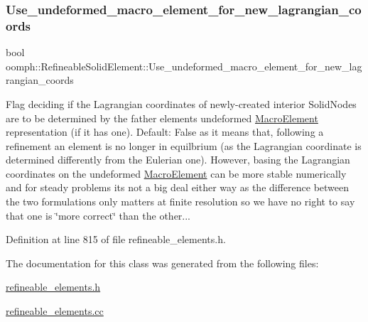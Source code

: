 \subsubsection{\texorpdfstring{Use\+\_\+undeformed\+\_\+macro\+\_\+element\+\_\+for\+\_\+new\+\_\+lagrangian\+\_\+coords}{Use\_undeformed\_macro\_element\_for\_new\_lagrangian\_coords}}
{\footnotesize\ttfamily bool oomph\+::\+Refineable\+Solid\+Element\+::\+Use\+\_\+undeformed\+\_\+macro\+\_\+element\+\_\+for\+\_\+new\+\_\+lagrangian\+\_\+coords\hspace{0.3cm}{\ttfamily [protected]}}



Flag deciding if the Lagrangian coordinates of newly-\/created interior Solid\+Nodes are to be determined by the father element\textquotesingle{}s undeformed \hyperlink{classoomph_1_1MacroElement}{Macro\+Element} representation (if it has one). Default\+: False as it means that, following a refinement an element is no longer in equilbrium (as the Lagrangian coordinate is determined differently from the Eulerian one). However, basing the Lagrangian coordinates on the undeformed \hyperlink{classoomph_1_1MacroElement}{Macro\+Element} can be more stable numerically and for steady problems it\textquotesingle{}s not a big deal either way as the difference between the two formulations only matters at finite resolution so we have no right to say that one is \char`\"{}more correct\char`\"{} than the other... 



Definition at line 815 of file refineable\+\_\+elements.\+h.



The documentation for this class was generated from the following files\+:\begin{DoxyCompactItemize}
\item 
\hyperlink{refineable__elements_8h}{refineable\+\_\+elements.\+h}\item 
\hyperlink{refineable__elements_8cc}{refineable\+\_\+elements.\+cc}\end{DoxyCompactItemize}
